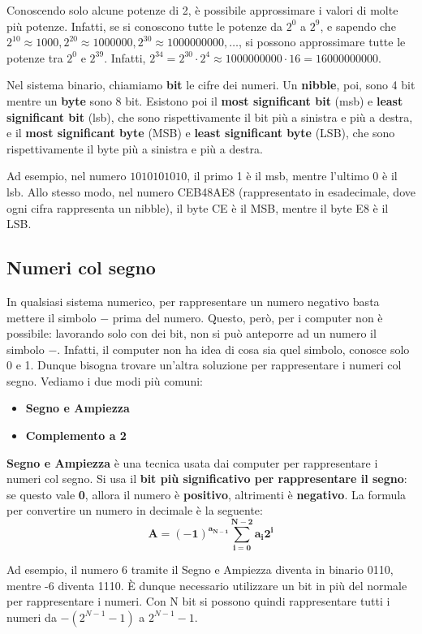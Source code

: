 \documentclass[11pt, a4paper, titlepage, oneside]{scrbook}
\begin{document}
\begin{Proprieta}[Potenze di 2]
\label{prop-potenze-2}
Conoscendo solo alcune potenze di 2, è possibile approssimare i valori di molte più potenze. Infatti, se si conoscono tutte le potenze da $2^0$ a $2^9$, e sapendo che \mbox{$2^{10} \approx 1000, 2^{20} \approx 1000000, 2^{30} \approx 1000000000, \ldots$}, si possono approssimare tutte le potenze tra $2^0$ e $2^{39}$. Infatti, $2^{34} = 2^{30} \cdot 2^4 \approx 1000000000 \cdot 16 = 16000000000$.
\end{Proprieta}

\begin{Definizione}
\label{def-definizioni-sistema-binario}
Nel sistema binario, chiamiamo \textbf{bit} le cifre dei numeri. Un \textbf{nibble}, poi, sono 4 bit mentre un \textbf{byte} sono 8 bit. Esistono poi il \textbf{most significant bit} (msb) e \textbf{least significant bit} (lsb), che sono rispettivamente il bit più a sinistra e più a destra, e il \textbf{most significant byte} (MSB) e \textbf{least significant byte} (LSB), che sono rispettivamente il byte più a sinistra e più a destra.  
\end{Definizione}

Ad esempio, nel numero $1010101010$, il primo 1 è il msb, mentre l'ultimo 0 è il lsb. Allo stesso modo, nel numero CEB48AE8 (rappresentato in esadecimale, dove ogni cifra rappresenta un nibble), il byte CE è il MSB, mentre il byte E8 è il LSB.

\subsection{Numeri col segno}

In qualsiasi sistema numerico, per rappresentare un numero negativo basta mettere il simbolo $-$ prima del numero. Questo, però, per i computer non è possibile: lavorando solo con dei bit, non si può anteporre ad un numero il simbolo $-$. Infatti, il computer non ha idea di cosa sia quel simbolo, conosce solo 0 e 1. Dunque bisogna trovare un'altra soluzione per rappresentare i numeri col segno. Vediamo i due modi più comuni:
\begin{itemize}
    \item \textbf{Segno e Ampiezza}
    \item \textbf{Complemento a 2}
\end{itemize}

\begin{Proprieta}
\label{def-Segno e Ampiezza}
\textbf{Segno e Ampiezza} è una tecnica usata dai computer per rappresentare i numeri col segno. Si usa il \textbf{bit più significativo per rappresentare il segno}: se questo vale \textbf{0}, allora il numero è \textbf{positivo}, altrimenti è \textbf{negativo}. La formula per convertire un numero in decimale è la seguente:
\[
\bm{A = (-1)^{a_{N-1}} \sum_{i = 0}^{N-2} a_i 2^i}
\]
\end{Proprieta}
Ad esempio, il numero 6 tramite il Segno e Ampiezza diventa in binario 0110, mentre -6 diventa 1110. È dunque necessario utilizzare un bit in più del normale per rappresentare i numeri. Con N bit si possono quindi rappresentare tutti i numeri da $-(2^{N-1} - 1)$ a $2^{N-1} - 1$. 
\end{document}
